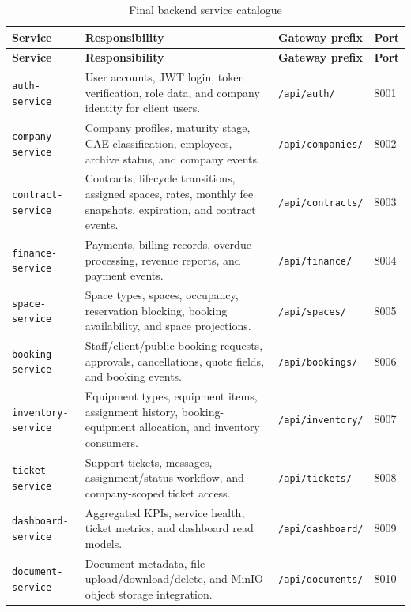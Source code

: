 \documentclass[12pt,a4paper]{report}
\newcommand{\service}[1]{\texttt{#1}}
\begin{document}
\begin{longtable}{L{0.20\textwidth}L{0.44\textwidth}L{0.20\textwidth}L{0.08\textwidth}}
\caption{Final backend service catalogue}\label{tab:service-catalogue}\\
\toprule
\textbf{Service} & \textbf{Responsibility} & \textbf{Gateway prefix} & \textbf{Port} \\
\midrule
\endfirsthead
\toprule
\textbf{Service} & \textbf{Responsibility} & \textbf{Gateway prefix} & \textbf{Port} \\
\midrule
\endhead
\service{auth-service} & User accounts, JWT login, token verification, role data, and company identity for client users. & \texttt{/api/auth/} & 8001 \\
\service{company-service} & Company profiles, maturity stage, CAE classification, employees, archive status, and company events. & \texttt{/api/companies/} & 8002 \\
\service{contract-service} & Contracts, lifecycle transitions, assigned spaces, rates, monthly fee snapshots, expiration, and contract events. & \texttt{/api/contracts/} & 8003 \\
\service{finance-service} & Payments, billing records, overdue processing, revenue reports, and payment events. & \texttt{/api/finance/} & 8004 \\
\service{space-service} & Space types, spaces, occupancy, reservation blocking, booking availability, and space projections. & \texttt{/api/spaces/} & 8005 \\
\service{booking-service} & Staff/client/public booking requests, approvals, cancellations, quote fields, and booking events. & \texttt{/api/bookings/} & 8006 \\
\service{inventory-service} & Equipment types, equipment items, assignment history, booking-equipment allocation, and inventory consumers. & \texttt{/api/inventory/} & 8007 \\
\service{ticket-service} & Support tickets, messages, assignment/status workflow, and company-scoped ticket access. & \texttt{/api/tickets/} & 8008 \\
\service{dashboard-service} & Aggregated KPIs, service health, ticket metrics, and dashboard read models. & \texttt{/api/dashboard/} & 8009 \\
\service{document-service} & Document metadata, file upload/download/delete, and MinIO object storage integration. & \texttt{/api/documents/} & 8010 \\
\bottomrule
\end{longtable}
\end{document}
